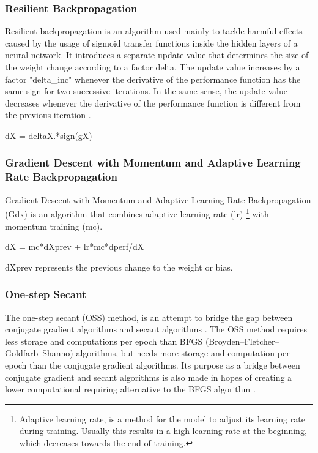 \subsubsection{Resilient Backpropagation}
Resilient backpropagation is an algorithm used mainly to tackle harmful effects caused by the usage of sigmoid transfer functions inside the hidden layers of a neural network. It introduces a separate update value that determines the size of the weight change according to a factor delta. The update value increases by a factor "delta\_inc"  whenever the derivative of the performance function has the same sign for two successive iterations. In the same sense, the update value decreases whenever the derivative of the performance function is different from the previous iteration \cite{matlab:trainrp}.

{
\centering dX = deltaX.*sign(gX) \par
}
\subsubsection{Gradient Descent with Momentum and Adaptive Learning Rate Backpropagation}
Gradient Descent with Momentum and Adaptive Learning Rate Backpropagation (Gdx) is an algorithm 
that combines adaptive learning rate (lr) \footnote{Adaptive learning rate, is a method for the model to adjust its learning rate during training. Usually this results in a high learning rate at the beginning, which decreases towards the end of training.} with momentum training (mc)\cite{gg:momentum}.

{
\centering dX = mc*dXprev + lr*mc*dperf/dX \par
}
dXprev represents the previous change to the weight or bias.

\subsubsection{One-step Secant}
The one-step secant (OSS) method, is an attempt to bridge the gap between conjugate gradient algorithms and secant algorithms \cite{ss:secant}. The OSS method requires less storage and computations per epoch than BFGS (Broyden–Fletcher–Goldfarb–Shanno) algorithms, but needs more storage and computation per epoch than the conjugate gradient algorithms. Its purpose as a bridge between conjugate gradient and secant algorithms is also made in hopes of creating a lower computational requiring alternative to the BFGS algorithm \cite{matlab:trainoss}. 

